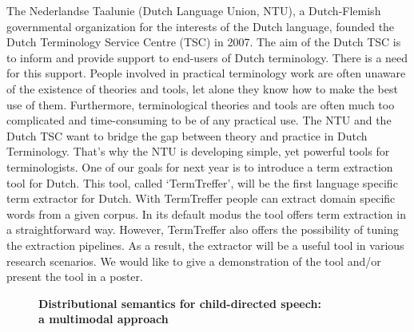 \documentclass[10pt, a4paper, twopage, headinclude, footinclude, BCOR5mm]{scrartcl}
\begin{document}
\noindent
The Nederlandse Taalunie (Dutch Language Union, NTU), a Dutch-Flemish governmental organization for the interests of the Dutch language, founded the Dutch Terminology Service Centre (TSC) in 2007. The aim of the Dutch TSC is to inform and provide support to end-users of Dutch terminology.  There is a need for this support. People involved in practical terminology work are often unaware of the existence of theories and tools, let alone they know how to make the best use of them. Furthermore, terminological theories and tools are often much too complicated and time-consuming to be of any practical use.   The NTU and the Dutch TSC want to bridge the gap between theory and practice in Dutch Terminology. That’s why the NTU is developing simple, yet powerful tools for terminologists. One of our goals for next year is to introduce a term extraction tool for Dutch. This tool, called ‘TermTreffer’, will be the first language specific term extractor for Dutch. With TermTreffer people can extract domain specific words from a given corpus. In its default modus the tool offers term extraction in a straightforward way. However, TermTreffer also offers the possibility of tuning the extraction pipelines. As a result, the extractor will be a useful tool in various research scenarios. We would like to give a demonstration of the tool and/or present the tool in a poster.


\newpage

\begin{figure}[t!]
\centering
\large\textbf{Distributional semantics for child-directed speech: \\ a multimodal approach}
\vspace*{0.5cm}
\end{figure}


        \begin{table}[t!]
    \end{table}
\end{document}
